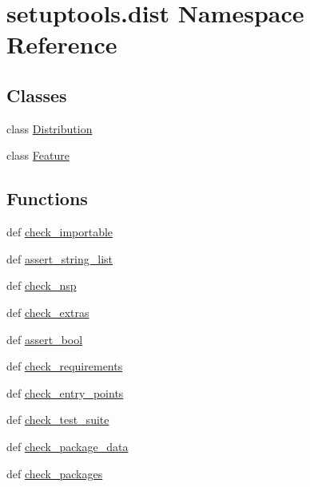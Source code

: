 \hypertarget{namespacesetuptools_1_1dist}{}\section{setuptools.\+dist Namespace Reference}
\label{namespacesetuptools_1_1dist}
\subsection*{Classes}
\begin{DoxyCompactItemize}
\item 
class \hyperlink{classsetuptools_1_1dist_1_1Distribution}{Distribution}
\item 
class \hyperlink{classsetuptools_1_1dist_1_1Feature}{Feature}
\end{DoxyCompactItemize}
\subsection*{Functions}
\begin{DoxyCompactItemize}
\item 
def \hyperlink{namespacesetuptools_1_1dist_a5765038cea125112cea22d5388b38961}{check\+\_\+importable}
\item 
def \hyperlink{namespacesetuptools_1_1dist_a12af4074ca1e4d8e29358cf589ff7d23}{assert\+\_\+string\+\_\+list}
\item 
def \hyperlink{namespacesetuptools_1_1dist_a4d407a94ff4089b5f099251a473f38ff}{check\+\_\+nsp}
\item 
def \hyperlink{namespacesetuptools_1_1dist_a0f707d62033f2a5228abcfb56c1e9fbf}{check\+\_\+extras}
\item 
def \hyperlink{namespacesetuptools_1_1dist_a83df023d08c81969337527b470ca5598}{assert\+\_\+bool}
\item 
def \hyperlink{namespacesetuptools_1_1dist_ab493870cab48b5398611a5b5ee059cfd}{check\+\_\+requirements}
\item 
def \hyperlink{namespacesetuptools_1_1dist_a1c2ce513cad102b0a7ea3578dba5de21}{check\+\_\+entry\+\_\+points}
\item 
def \hyperlink{namespacesetuptools_1_1dist_ab3d512aefe8706beda81e7c07dece9d2}{check\+\_\+test\+\_\+suite}
\item 
def \hyperlink{namespacesetuptools_1_1dist_a03bbcf8379b3ec936667cf72aa563774}{check\+\_\+package\+\_\+data}
\item 
def \hyperlink{namespacesetuptools_1_1dist_a74fafe9951270f59e90d989be282e53f}{check\+\_\+packages}
\end{DoxyCompactItemize}
